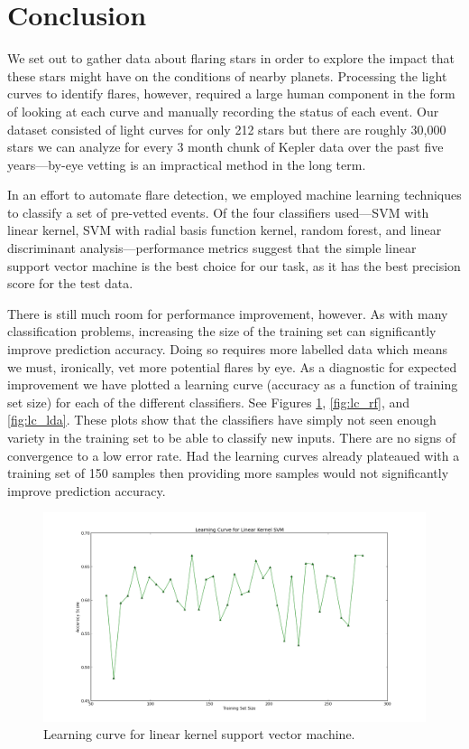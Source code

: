 \documentclass[11pt]{article}
\begin{document}
\section{Conclusion}
\label{sec:conc}
We set out to gather data about flaring stars in order to explore the
impact that these stars might have on the conditions of nearby
planets.  Processing the light curves to identify flares, however,
required a large human component in the form of looking at each curve
and manually recording the status of each event.  Our dataset
consisted of light curves for only 212 stars but there are roughly
30,000 stars we can analyze for every 3 month chunk of Kepler data
over the past five years---by-eye vetting is an impractical method in
the long term.

In an effort to automate flare detection, we employed machine learning
techniques to classify a set of pre-vetted events.  Of the four
classifiers used---SVM with linear kernel, SVM with radial basis
function kernel, random forest, and linear discriminant
analysis---performance metrics suggest that the simple linear support
vector machine is the best choice for our task, as it has the best
precision score for the test data.

There is still much room for performance improvement, however.  As
with many classification problems, increasing the size of the training
set can significantly improve prediction accuracy.  Doing so requires
more labelled data which means we must, ironically, vet more potential
flares by eye.  As a diagnostic for expected improvement we have
plotted a learning curve (accuracy as a function of training set size)
for each of the different classifiers.  See Figures \ref{fig:lc_lin},
\ref{fig:lc_rf}, and \ref{fig:lc_lda}. These plots show that the
classifiers have simply not seen enough variety in the training set to
be able to classify new inputs.  There are no signs of convergence to
a low error rate.  Had the learning curves already plateaued with a
training set of 150 samples then providing more samples would not
significantly improve prediction accuracy.

\begin{figure}[h!]
  \caption{Learning curve for linear kernel support vector machine.}
  \label{fig:lc_lin}
  \centering
    \includegraphics[width=\textwidth]{learncurve_linear}
\end{figure}
\end{document}
